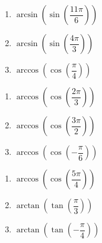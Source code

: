\begin{multicols}{3}

\begin{enumerate}

\setcounter{enumi}{\value{HW}}

\item  $\arcsin\left(\sin\left(\dfrac{11\pi}{6}\right) \right)$
\item  $\arcsin\left(\sin\left(\dfrac{4\pi}{3}\right) \right)$
\item  $\arccos\left(\cos\left(\dfrac{\pi}{4}\right) \right)$  

\setcounter{HW}{\value{enumi}}

\end{enumerate}

\end{multicols}

\begin{multicols}{3}

\begin{enumerate}

\setcounter{enumi}{\value{HW}}

\item  $\arccos\left(\cos\left(\dfrac{2\pi}{3}\right) \right)$
\item  $\arccos\left(\cos\left(\dfrac{3\pi}{2}\right) \right)$
\item  $\arccos\left(\cos\left(-\dfrac{\pi}{6}\right) \right)$  

\setcounter{HW}{\value{enumi}}

\end{enumerate}

\end{multicols}

\begin{multicols}{3}

\begin{enumerate}

\setcounter{enumi}{\value{HW}}

\item  $\arccos\left(\cos\left(\dfrac{5\pi}{4}\right) \right)$
\item  $\arctan\left(\tan\left(\dfrac{\pi}{3}\right) \right)$  
\item  $\arctan\left(\tan\left(-\dfrac{\pi}{4}\right) \right)$  

\setcounter{HW}{\value{enumi}}

\end{enumerate}

\end{multicols}

